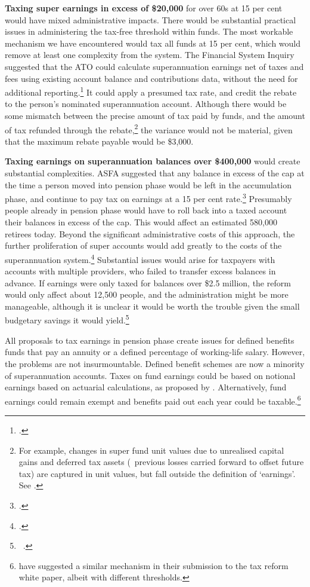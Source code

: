 \textbf{Taxing super earnings in excess of \$20,000} for over 60s at 15 per cent would have mixed administrative impacts. There would be substantial practical issues in administering the tax-free threshold within funds. The most workable mechanism we have encountered would tax all funds at 15 per cent, which would remove at least one complexity from the system. The Financial System Inquiry suggested that the ATO could calculate superannuation earnings net of taxes and fees using existing account balance and contributions data, without the need for additional reporting.\footcite[][141]{FinancialSystemsInquiry2015}  It could apply a presumed tax rate, and credit the rebate to the person’s nominated superannuation account. Although there would be some mismatch between the precise amount of tax paid by funds, and the amount of tax refunded through the rebate,\footnote{For example, changes in super fund unit values due to unrealised capital gains and deferred tax assets (\ie~previous losses carried forward to offset future tax) are captured in unit values, but fall outside the definition of ‘earnings’. See \textcite[][26]{FinancialSystemsInquiry2015}.}  the variance would not be material, given that the maximum rebate payable would be \$3,000.

\textbf{Taxing earnings on superannuation balances over \$400,000} would create substantial complexities. ASFA suggested that any balance in excess of the cap at the time a person moved into pension phase would be left in the accumulation phase, and continue to pay tax on earnings at a 15 per cent rate.\footcite[][18]{ASFA2015TreasurySubmission}  Presumably people already in pension phase would have to roll back into a taxed account their balances in excess of the cap. This would affect an estimated 580,000 retirees today. Beyond the significant administrative costs of this approach, the further proliferation of super accounts would add greatly to the costs of the superannuation system.\footcite[][13]{MinifieSavageCameron2015}  Substantial issues would arise for taxpayers with accounts with multiple providers, who failed to transfer excess balances in advance. If earnings were only taxed for balances over \$2.5 million, the reform would only affect about 12,500 people, and the administration might be more manageable, although it is unclear it would be worth the trouble given the small budgetary savings it would yield.\footnote{\gao\ \textcite{ABS2013t}.}

All proposals to tax earnings in pension phase create issues for defined benefits funds that pay an annuity or a defined percentage of working-life salary. However, the problems are not insurmountable. Defined benefit schemes are now a minority of superannuation accounts. Taxes on fund earnings could be based on notional earnings based on actuarial calculations, as proposed by \textcite{SwanShorten2013}. Alternatively, fund earnings could remain exempt and benefits paid out each year could be taxable.\footnote{\textcite{ASFA2015TreasurySubmission} have suggested a similar mechanism in their submission to the tax reform white paper, albeit with different thresholds.}

